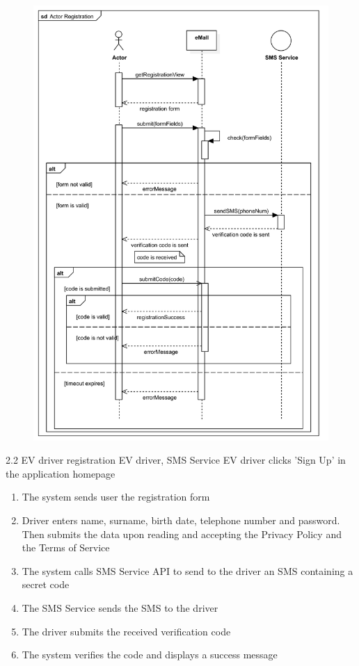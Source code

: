 \usecase
{
    \begin{figure}[H]
        \centering
        \includegraphics[scale=0.9]{src/sequence_diagram/ActorRegistration.png}
    \end{figure}
}
{2.2}
{EV driver registration}
{EV driver, SMS Service}
{EV driver clicks 'Sign Up' in the application homepage}
{
    \begin{enumerate}
        \item The system sends user the registration form
        \item Driver enters name, surname, birth date, telephone number and password. Then submits the data upon reading and accepting the Privacy Policy and the Terms of Service
        \item The system calls SMS Service API to send to the driver an SMS containing a secret code
        \item The SMS Service sends the SMS to the driver
        \item The driver submits the received verification code
        \item The system verifies the code and displays a success message
    \end{enumerate}
}
